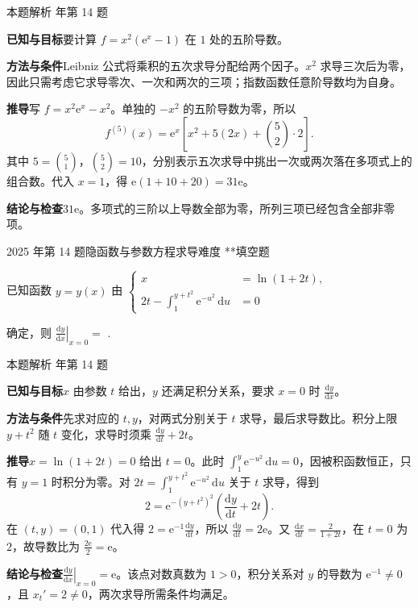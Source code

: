 \documentclass[UTF8,zihao=-4,fontset=fandol]{ctexart}
\newcommand{\blank}{\underline{\hspace{5em}}}
\newcounter{BankQuestion}
\newcommand{\QuestionPage}[7]{%
  \stepcounter{BankQuestion}%
  \par\noindent\begin{minipage}{\linewidth}
  \raggedright
  {\small\textcolor{black!60}{#3\quad #5\quad 难度 #7}\hfill\textcolor{accent}{#2}}\par\smallskip}
\newcommand{\QuestionEnd}{\end{minipage}\par\medskip}
\newcommand{\QuestionPage}[7]{%
  \clearpage
  \stepcounter{BankQuestion}%
  {\small\textcolor{accent}{#1\hfill #2}}\par\medskip
  {\small\textcolor{black!60}{#3\quad #5\quad 难度 #7\hfill \arabic{BankQuestion} / 234}}\par\vspace{9bp}}
\newcommand{\QuestionEnd}{}
\newenvironment{QuestionSolution}[1]{%
  \clearpage
  {\small\textcolor{black!60}{本题解析\quad #1}}\par\medskip
}{\par\clearpage}
\begin{document}
\begin{QuestionSolution}{2024 年第 14 题}
\textbf{已知与目标}\quad 要计算 \(f=x^2(\mathrm e^x-1)\) 在 \(1\) 处的五阶导数。

\textbf{方法与条件}\quad Leibniz 公式将乘积的五次求导分配给两个因子。\(x^2\) 求导三次后为零，因此只需考虑它求导零次、一次和两次的三项；指数函数任意阶导数均为自身。

\textbf{推导}\quad 写 \(f=x^2\mathrm e^x-x^2\)。单独的 \(-x^2\) 的五阶导数为零，所以
\[
f^{(5)}(x)=\mathrm{e}^x\left[x^2+5(2x)+\binom52\cdot2\right].
\]
其中 \(5=\binom51\)，\(\binom52=10\)，分别表示五次求导中挑出一次或两次落在多项式上的组合数。代入 \(x=1\)，得 \(\mathrm e(1+10+20)=31\mathrm e\)。

\textbf{结论与检查}\quad \(\boxed{31\mathrm{e}}\)。多项式的三阶以上导数全部为零，所列三项已经包含全部非零项。
\end{QuestionSolution}

\QuestionPage{2.2 求导的基本法则}{填空题}{2025 年第 14 题}{2}{隐函数与参数方程求导}{081 / 234}{**}
已知函数 \(y = y\left( x \right)\) 由 \(\left\{ \begin{aligned} x &= \ln \left( 1 + 2t \right), \\ 2t - \int_{1}^{y + t^{2}} \mathrm{e}^{-u^{2}} \,\mathrm{d} u &= 0 \end{aligned} \right.\)

确定，则 \(\left. \frac{\mathrm{d} y}{\mathrm{d} x} \right|_{x = 0} =\) \blank{}.
\QuestionEnd

\begin{QuestionSolution}{2025 年第 14 题}
\textbf{已知与目标}\quad \(x\) 由参数 \(t\) 给出，\(y\) 还满足积分关系，要求 \(x=0\) 时 \(\frac{\mathrm dy}{\mathrm dx}\)。

\textbf{方法与条件}\quad 先求对应的 \(t,y\)，对两式分别关于 \(t\) 求导，最后求导数比。积分上限 \(y+t^2\) 随 \(t\) 变化，求导时须乘 \(\frac{\mathrm dy}{\mathrm dt}+2t\)。

\textbf{推导}\quad \(x=\ln(1+2t)=0\) 给出 \(t=0\)。此时 \(\int_1^y\mathrm e^{-u^2}\,\mathrm du=0\)，因被积函数恒正，只有 \(y=1\) 时积分为零。对 \(2t=\int_1^{y+t^2}\mathrm e^{-u^2}\,\mathrm du\) 关于 \(t\) 求导，得到
\[
2=\mathrm{e}^{-(y+t^2)^2}\left(\frac{\mathrm{d}y}{\mathrm{d}t}+2t\right).
\]
在 \((t,y)=(0,1)\) 代入得 \(2=\mathrm e^{-1}\frac{\mathrm dy}{\mathrm dt}\)，所以 \(\frac{\mathrm dy}{\mathrm dt}=2\mathrm e\)。又 \(\frac{\mathrm dx}{\mathrm dt}=\frac2{1+2t}\)，在 \(t=0\) 为 \(2\)，故导数比为 \(\frac{2\mathrm e}{2}=\mathrm e\)。

\textbf{结论与检查}\quad \(\boxed{\left.\frac{\mathrm{d}y}{\mathrm{d}x}\right|_{x=0}=\mathrm{e}}\)。该点对数真数为 \(1>0\)，积分关系对 \(y\) 的导数为 \(\mathrm e^{-1}\ne0\)，且 \(x_t'=2\ne0\)，两次求导所需条件均满足。
\end{QuestionSolution}
\end{document}
